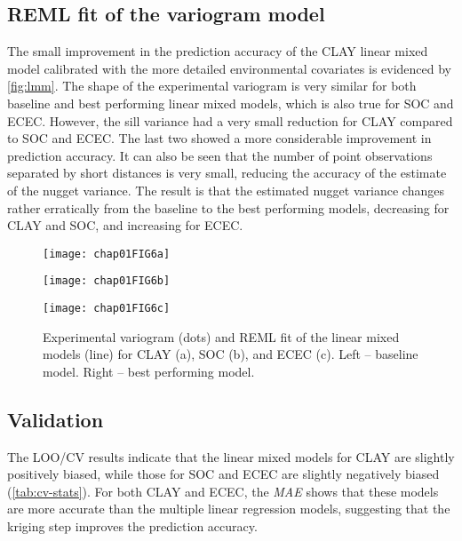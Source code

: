 

\subsection{REML fit of the variogram model}

The small improvement in the prediction accuracy of the CLAY linear mixed model 
calibrated with the more detailed environmental covariates is evidenced by 
\autoref{fig:lmm}. The shape of the experimental variogram is very similar 
for both baseline and best performing linear mixed models, which is also true 
for SOC and ECEC. However, the sill variance had a very small reduction for 
CLAY compared to SOC and ECEC. The last two showed a more considerable 
improvement in prediction accuracy. It can also be seen that the number of 
point observations separated by short distances is very small, reducing the 
accuracy of the estimate of the nugget variance. The result is that the 
estimated nugget variance changes rather erratically from the baseline to the 
best performing models, decreasing for CLAY and SOC, and increasing for ECEC.

\begin{figure}[!ht]
  \begin{center}
    \begin{minipage}[b]{90mm}
      \subcaption{}
      \texttt{[image: chap01FIG6a]} 
    \end{minipage}
    \begin{minipage}[b]{90mm}
      \subcaption{}
      \texttt{[image: chap01FIG6b]}
    \end{minipage}
    \begin{minipage}[b]{90mm}
      \subcaption{}
      \texttt{[image: chap01FIG6c]}
    \end{minipage}
    \caption{Experimental variogram (dots) and REML fit of the linear mixed 
    models (line) for CLAY (a), SOC (b), and ECEC (c). Left -- baseline model.
    Right -- best performing model.}
    \label{fig:lmm}
  \end{center}
\end{figure}

\subsection{Validation}

The LOO\-/CV results indicate that the linear mixed models for CLAY are slightly
positively biased, while those for SOC and ECEC are slightly negatively biased 
(\autoref{tab:cv-stats}). For both CLAY and ECEC, the \textit{MAE} shows that 
these models are more accurate than the multiple linear regression models, 
suggesting that the kriging step improves the prediction accuracy.

